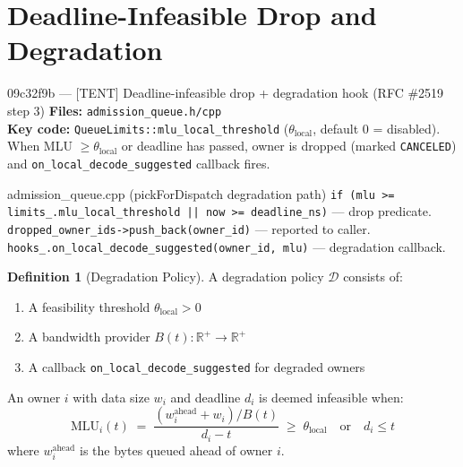 \documentclass[11pt,a4paper,twoside]{article}
\theoremstyle{plain}
\theoremstyle{definition}
\newtheorem{definition}[theorem]{Definition}
\theoremstyle{remark}
\newcommand{\Real}{\mathbb{R}}
\begin{document}
\section{Deadline-Infeasible Drop and Degradation}
\label{sec:degradation}

\begin{commitbox}{09c32f9b --- [TENT] Deadline-infeasible drop + degradation hook
(RFC \#2519 step 3)}
\textbf{Files:} \texttt{admission\_queue.h/cpp}\\
\textbf{Key code:} \texttt{QueueLimits::mlu\_local\_threshold} ($\theta_{\text{local}}$,
default 0 = disabled). When MLU $\geq \theta_{\text{local}}$ or deadline has passed,
owner is dropped (marked \texttt{CANCELED}) and \texttt{on\_local\_decode\_suggested}
callback fires.
\end{commitbox}

\begin{codeline}{admission\_queue.cpp (pickForDispatch degradation path)}
\texttt{if (mlu >= limits\_.mlu\_local\_threshold || now >= deadline\_ns)} ---
drop predicate.\\
\texttt{dropped\_owner\_ids->push\_back(owner\_id)} --- reported to caller.\\
\texttt{hooks\_.on\_local\_decode\_suggested(owner\_id, mlu)} --- degradation callback.
\end{codeline}

\begin{definition}[Degradation Policy]
\label{def:degradation}
A degradation policy $\mathcal{D}$ consists of:
\begin{enumerate}[nosep]
  \item A feasibility threshold $\theta_{\text{local}} > 0$
  \item A bandwidth provider $B(t): \Real^+ \to \Real^+$
  \item A callback \texttt{on\_local\_decode\_suggested} for degraded owners
\end{enumerate}
An owner $i$ with data size $w_i$ and deadline $d_i$ is deemed infeasible when:
\begin{equation}
  \text{MLU}_i(t) \;=\; \frac{(w_i^{\text{ahead}} + w_i) / B(t)}{d_i - t}
  \;\geq\; \theta_{\text{local}}
  \quad\text{or}\quad d_i \leq t
  \label{eq:drop-criterion}
\end{equation}
where $w_i^{\text{ahead}}$ is the bytes queued ahead of owner $i$.
\end{definition}
\end{document}
